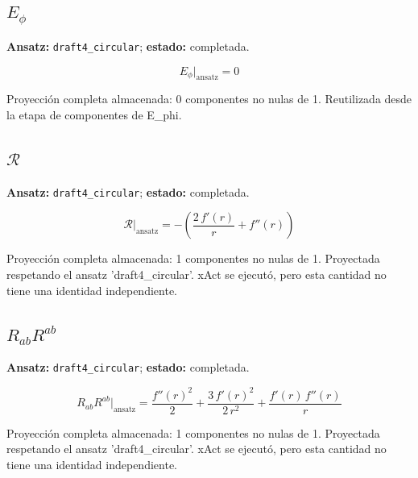 \documentclass[11pt]{article}
\begin{document}
\subsection*{$ E_{\phi} $}
\textbf{Ansatz:} \texttt{draft4\_circular}; \textbf{estado:} completada.\par
\begin{dmath*}[breakdepth={5}]
E_{\phi}\big|_{\mathrm{ansatz}} = 0
\end{dmath*}
\par\smallskip
Proyección completa almacenada: 0 componentes no nulas de 1. Reutilizada desde la etapa de componentes de E\_phi.\par\medskip
{}
\subsection*{$ \mathcal{R} $}
\textbf{Ansatz:} \texttt{draft4\_circular}; \textbf{estado:} completada.\par
\begin{dmath*}[breakdepth={5}]
\mathcal{R}\big|_{\mathrm{ansatz}} = -\left(\frac{2\,f'\!\left(r\right)}{r} + f''\!\left(r\right)\right)
\end{dmath*}
\par\smallskip
Proyección completa almacenada: 1 componentes no nulas de 1. Proyectada respetando el ansatz 'draft4\_circular'. xAct se ejecutó, pero esta cantidad no tiene una identidad independiente.\par\medskip
{}
\subsection*{$ R_{ab}R^{ab} $}
\textbf{Ansatz:} \texttt{draft4\_circular}; \textbf{estado:} completada.\par
\begin{dmath*}[breakdepth={5}]
R_{ab}R^{ab}\big|_{\mathrm{ansatz}} = \frac{{f''\!\left(r\right)}^{2}}{2} + \frac{3\,{f'\!\left(r\right)}^{2}}{2\,{r}^{2}} + \frac{f'\!\left(r\right)\,f''\!\left(r\right)}{r}
\end{dmath*}
\par\smallskip
Proyección completa almacenada: 1 componentes no nulas de 1. Proyectada respetando el ansatz 'draft4\_circular'. xAct se ejecutó, pero esta cantidad no tiene una identidad independiente.\par\medskip
{}
\end{document}
